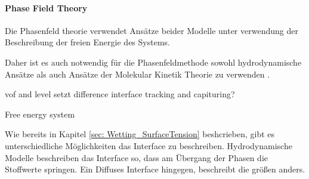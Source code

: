 


\paragraph{Phase Field Theory}
Die Phasenfeld theorie verwendet Ansätze beider Modelle unter verwendung der Beschreibung der freien Energie des Systems.

Daher ist es auch notwendig für die Phasenfeldmethode sowohl hydrodynamische Ansätze als auch Ansätze der Molekular Kinetik Theorie zu verwenden \cite{blake2006PhysicsMovingWetting, carlsonCapillarityDynamicWetting2012}.

vof and level setzt
difference interface tracking and capituring? 

Free energy system 





Wie bereits in Kapitel \ref{sec: Wetting_SurfaceTension} beshcrieben, gibt es unterschiedliche Möglichkeiten das Interface zu beschreiben. Hydrodynamische Modelle beschreiben das Interface so, dass am Übergang der Phasen die Stoffwerte springen. Ein Diffuses Interface hingegen, beschreibt die größen anders. 


